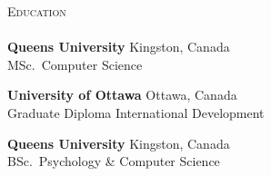\documentclass[letterpaper]{article}
\newcommand{\lineunder} {
    \vspace*{-8pt} \\
    \hspace*{-18pt} \hrulefill \\
}
\newcommand{\header} [1] {
    {\hspace*{-18pt}\vspace*{6pt} \textsc{#1}}
    \vspace*{-6pt} \lineunder
}
\begin{document}
\header{Education}
    \textbf{Queen\textquotesingle{}s University}
        \hfill Kingston, Canada\\
        MSc.~Computer Science\\
        \vspace{2mm}

    \textbf{University of Ottawa}
        \hfill Ottawa, Canada\\
        Graduate Diploma International Development\\
        \vspace{2mm}

    \textbf{Queen\textquotesingle{}s University}
        \hfill Kingston, Canada\\
        BSc.~Psychology \& Computer Science\\
        \vspace{2mm}
\end{document}
